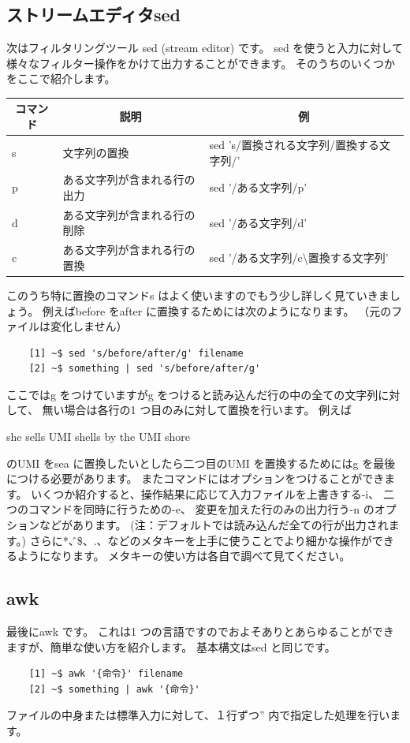 \documentclass[a4j]{ltjreport}
\begin{document}
    \subsection{ストリームエディタsed}
    次はフィルタリングツール sed (stream editor) です。
    sed を使うと入力に対して様々なフィルター操作をかけて出力することができます。
    そのうちのいくつかをここで紹介します。
    \begin{longtable}[c]{|p{2cm}|p{6.5cm}|p{8cm}|}
        \hline
        \multicolumn{1}{|c|}{\textbf{コマンド}}&\multicolumn{1}{|c|}{\textbf{説明}}&\multicolumn{1}{|c|}{\textbf{例}}\\
        \hline\hline
        s &文字列の置換& sed 's/置換される文字列/置換する文字列/' \\
        \hline
        p &ある文字列が含まれる行の出力& sed '/ある文字列/p'\\
        \hline
        d &ある文字列が含まれる行の削除& sed '/ある文字列/d'\\
        \hline
        c &ある文字列が含まれる行の置換& sed '/ある文字列/c\textbackslash 置換する文字列'\\
        \hline
    \end{longtable}
    このうち特に置換のコマンドs はよく使いますのでもう少し詳しく見ていきましょう。
    例えばbefore をafter に置換するためには次のようになります。
    （元のファイルは変化しません）
    \begin{verbatim}
    [1] ~$ sed 's/before/after/g' filename
    [2] ~$ something | sed 's/before/after/g'
    \end{verbatim}
    ここではg をつけていますがg をつけると読み込んだ行の中の全ての文字列に対して、
    無い場合は各行の1 つ目のみに対して置換を行います。
    例えば
    \begin{center}
        she sells UMI shells by the UMI shore
    \end{center}
    のUMI をsea に置換したいとしたら二つ目のUMI を置換するためにはg を最後につける必要があります。
    またコマンドにはオプションをつけることができます。
    いくつか紹介すると、操作結果に応じて入力ファイルを上書きする-i、
    二つのコマンドを同時に行うための-e、
    変更を加えた行のみの出力行う-n のオプションなどがあります。
    (注：デフォルトでは読み込んだ全ての行が出力されます。) 
    さらに*、\^、\$、.、などのメタキーを上手に使うことでより細かな操作ができるようになります。
    メタキーの使い方は各自で調べて見てください。

    \subsection{awk}
    最後にawk です。
    これは1 つの言語ですのでおよそありとあらゆることができますが、簡単な使い方を紹介します。
    基本構文はsed と同じです。
    \begin{verbatim}
    [1] ~$ awk '{命令}' filename
    [2] ~$ something | awk '{命令}'
    \end{verbatim}
    ファイルの中身または標準入力に対して、１行ずつ'' 内で指定した処理を行います。
\end{document}
